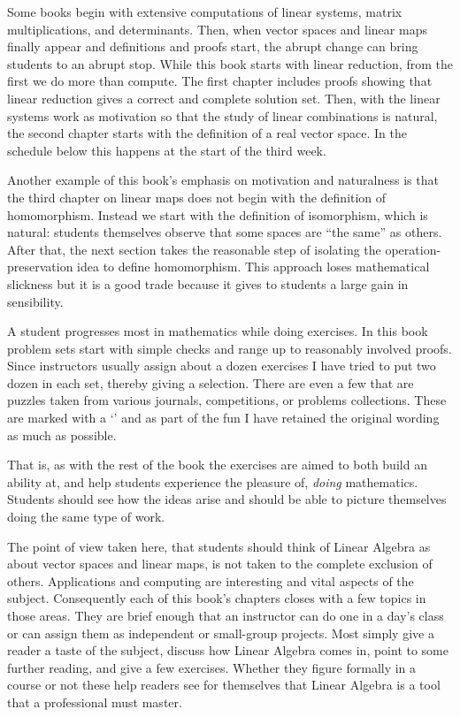 {Some books
begin with extensive computations of linear systems, 
matrix multiplications, 
and determinants.
Then, when 
vector spaces and linear maps finally appear
and definitions and proofs start, the abrupt change
can bring students to an abrupt stop.
While this book starts with
linear reduction, from the first
we do more than compute.
The first chapter
includes proofs showing that linear reduction gives a correct and
complete solution set.
Then, with the linear systems work as motivation
so that the study of linear combinations is natural,
the second chapter starts with the definition of a real vector space.
In the schedule below this happens at the start of the third week.

Another example of this book's emphasis on motivation and naturalness
is that the third chapter on linear maps
does not begin with the definition of homomorphism.
Instead we start with the definition of isomorphism, which
is natural: students themselves
observe that some spaces are ``the same'' as others.
After that,
the next section takes the reasonable step of 
isolating the operation-preservation idea
to define homomorphism.
This approach loses mathematical slickness 
but it is a good trade because it gives to students
a large gain in sensibility.

A student progresses most in mathematics while doing exercises. 
In this book problem sets start with 
simple checks and range up to reasonably involved proofs.
Since instructors usually assign about a dozen exercises
I have tried to put two dozen in each set, 
thereby giving a selection.
There are even a few that are puzzles
taken from various journals, competitions, or
problems collections. 
These are marked with a
`\puzzlemark' and 
as part of the fun I have retained the original wording
as much as possible.

That is, as with the rest of the book 
the exercises are aimed to both build an ability at,
and help students experience the pleasure of, 
\emph{doing} mathematics.
Students should see how the ideas arise and should be able to 
picture themselves doing the same type of work.


\medskip
{}
The point of view taken here, that students should think of 
Linear Algebra as about vector spaces
and linear maps, is not taken to the complete exclusion of others.
Applications and computing are interesting and vital aspects 
of the subject.
Consequently each of this book's chapters closes with a few 
topics in those areas.
They are brief enough that an instructor can do one
in a day's class 
or can assign them as independent or small-group projects.
Most simply give a reader
a taste of the subject, discuss how Linear Algebra comes in,
point to some further reading, and give a few exercises. 
Whether they figure formally in a course or not these help
readers see for themselves that Linear Algebra is a tool
that a professional must master. 




}
